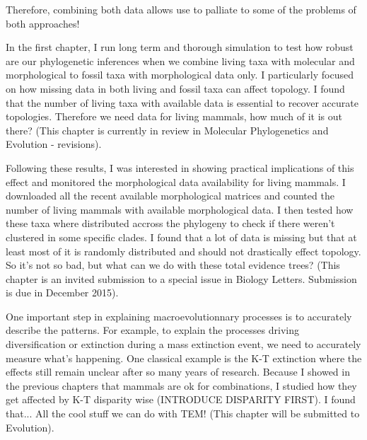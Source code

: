 Therefore, combining both data allows use to palliate to some of the problems of both approaches!




In the first chapter, I run long term and thorough simulation to test how robust are our phylogenetic inferences when we combine living taxa with molecular and morphological to fossil taxa with morphological data only.
I particularly focused on how missing data in both living and fossil taxa can affect topology.
I found that the number of living taxa with available data is essential to recover accurate topologies.
Therefore we need data for living mammals, how much of it is out there?
(This chapter is currently in review in Molecular Phylogenetics and Evolution - revisions).

Following these results, I was interested in showing practical implications of this effect and monitored the morphological data availability for living mammals.
I downloaded all the recent available morphological matrices and counted the number of living mammals with available morphological data.
I then tested how these taxa where distributed accross the phylogeny to check if there weren't clustered in some specific clades.
I found that a lot of data is missing but that at least most of it is randomly distributed and should not drastically effect topology.
So it's not so bad, but what can we do with these total evidence trees?
(This chapter is an invited submission to a special issue in Biology Letters. Submission is due in December 2015).

One important step in explaining macroevolutionnary processes is to accurately describe the patterns.
For example, to explain the processes driving diversification or extinction during a mass extinction event, we need to accurately measure what's happening.
One classical example is the K-T extinction where the effects still remain unclear after so many years of research.
Because I showed in the previous chapters that mammals are ok for combinations, I studied how they get affected by K-T disparity wise (INTRODUCE DISPARITY FIRST).
I found that...
All the cool stuff we can do with TEM!
(This chapter will be submitted to Evolution).

